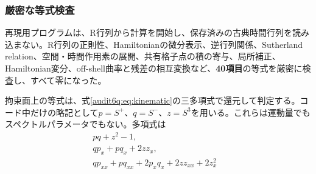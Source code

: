 \subsubsection{厳密な等式検査}
再現用プログラムは、R行列から計算を開始し、保存済みの古典時間行列を読み込まない。R行列の正則性、Hamiltonianの微分表示、逆行列関係、Sutherland relation、空間・時間作用素の展開、共有格子点の積の寄与、局所補正、Hamiltonian変分、off-shell曲率と残差の相互変換など、\textbf{40項目}の等式を厳密に検査し、すべて零になった。

拘束面上の等式は、式\eqref{audit6q:eq:kinematic}の三多項式で還元して判定する。コード中だけの略記として$p=S^+$、$q=S^-$、$z=S^3$を用いる。これらは運動量でもスペクトルパラメータでもない。多項式は
\begin{align}
pq+z^2-1,&\nonumber\\
qp_x+pq_x+2zz_x,&\nonumber\\
qp_{xx}+pq_{xx}+2p_xq_x+2zz_{xx}+2z_x^2&
\label{audit6q:eq:ideal}
\end{align}

